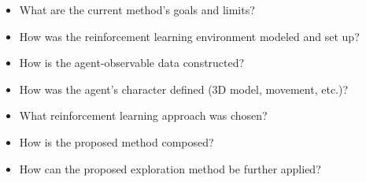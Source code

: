 \begin{itemize}
    \item What are the current method's goals and limits?
    \item How was the reinforcement learning environment modeled and set up?
    \item How is the agent-observable data constructed?
    \item How was the agent's character defined (3D model, movement, etc.)?
    \item What reinforcement learning approach was chosen? 
    \item How is the proposed method composed? 
    \item How can the proposed exploration method be further applied?
\end{itemize}


